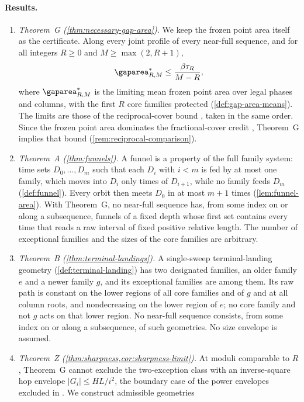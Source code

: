 \paragraph{Results.}
\begin{enumerate}
\item \emph{Theorem~G (\cref{thm:necessary-gap-area}).} We keep the frozen point area
itself as the certificate. Along every joint profile of every near-full sequence, and
for all integers $R\ge0$ and $M\ge\max(2,R+1)$,
\[
 \limarea_{R,M}\le\frac{\beta\tau_R}{M-R},
\]
where $\limarea_{R,M}$ is the limiting mean frozen point area over legal phases and
columns, with the first $R$ core families protected (\cref{def:gap-area-means}). The
limits are those of the reciprocal-cover bound \cite[Theorem~4.6]{SourceCovers2026},
taken in the same order. Since the frozen point area dominates the fractional-cover
credit \cite[Lemma~3.3]{SourceCovers2026}, Theorem~G implies that bound
(\cref{rem:reciprocal-comparison}).
\item \emph{Theorem~A (\cref{thm:funnels}).} A funnel is a property of the full family
system: time sets $D_0,\dots,D_m$ such that each $D_i$ with $i<m$ is fed by at most
one family, which moves into $D_i$ only times of $D_{i+1}$, while no family feeds
$D_m$ (\cref{def:funnel}). Every orbit then meets $D_0$ in at most $m+1$ times
(\cref{lem:funnel-area}). With Theorem~G, no near-full sequence has, from some index on
or along a subsequence, funnels of a fixed depth whose first set contains every time
that reads a raw interval of fixed positive relative length. The number of exceptional
families and the sizes of the core families are arbitrary.
\item \emph{Theorem~B (\cref{thm:terminal-landings}).} A single-sweep terminal-landing
geometry (\cref{def:terminal-landing}) has two designated families, an older family
$e$ and a newer family $g$, and its exceptional families are among them. Its raw path
is constant on the lower regions of all core families and of $g$ and at all column
roots, and nondecreasing on the lower region of $e$; no core family and not $g$ acts
on that lower region. No near-full sequence consists, from some index on or along a
subsequence, of such geometries. No size envelope is assumed.
\item \emph{Theorem~Z (\cref{thm:sharpness,cor:sharpness-limit}).} At moduli
comparable to $R$, Theorem~G cannot exclude the two-exception class with an
inverse-square hop envelope $|G_i|\le HL/i^2$, the boundary case of the power envelopes
excluded in \cite[Corollary~4.4]{SourceCovers2026}. We construct admissible geometries

\end{enumerate}

